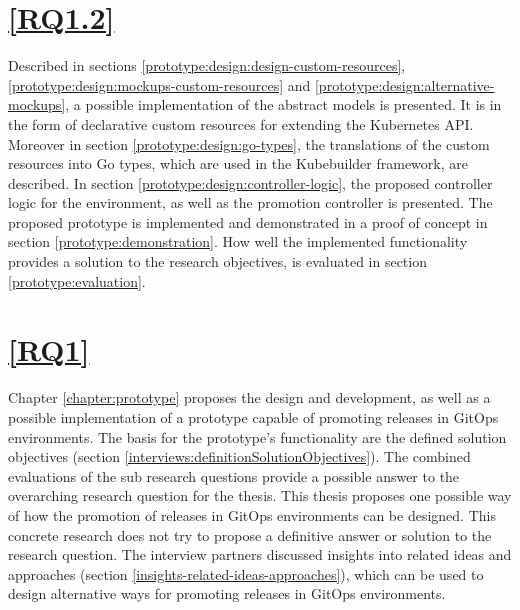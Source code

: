 \section*{\ref{RQ1.2}}

Described in sections \ref{prototype:design:design-custom-resources}, \ref{prototype:design:mockups-custom-resources} and \ref{prototype:design:alternative-mockups},
a possible implementation of the abstract models is presented.
It is in the form of declarative custom resources for extending the Kubernetes API.
%
Moreover in section \ref{prototype:design:go-types},
the translations of the custom resources into Go types, which are used in the Kubebuilder framework,
are described.
In section \ref{prototype:design:controller-logic},
the proposed controller logic for the environment, as well as the promotion controller is presented.
%
The proposed prototype is implemented and demonstrated in a proof of concept in section
\ref{prototype:demonstration}.
How well the implemented functionality provides a solution to the research objectives,
is evaluated in section \ref{prototype:evaluation}.


\newpage

\section*{\ref{RQ1}}

Chapter \ref{chapter:prototype} proposes the design and development,
as well as a possible implementation of a prototype
capable of promoting releases in GitOps environments.
The basis for the prototype's functionality are the
defined solution objectives (section \ref{interviews:definitionSolutionObjectives}).
The combined evaluations of the sub research questions provide a possible answer to the
overarching research question for the thesis.
%
This thesis proposes one possible way of how
the promotion of releases in GitOps environments can be designed.
This concrete research does not try to
propose a definitive answer or solution to the research question.
%
The interview partners discussed insights into related ideas and approaches
(section \ref{insights-related-ideas-approaches}),
which can be used to design alternative ways for promoting
releases in GitOps environments.





































